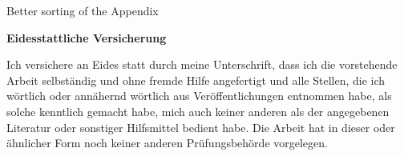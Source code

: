 \documentclass[12pt,a4paper]{article}
\begin{document}
Better sorting of the Appendix

\restoregeometry

\cleardoublepage
\newpage
\renewcommand*{\mkbibnamefamily}[1]{\textbf{#1}}
\renewcommand*{\mkbibnamegiven}[1]{\textbf{#1}}
\renewcommand*{\mkbibnameprefix}[1]{\textbf{#1}}
\renewcommand*{\mkbibnamesuffix}[1]{\textbf{#1}}




\newpage
\textbf{Eidesstattliche Versicherung}

\bigskip

Ich versichere an Eides statt durch meine Unterschrift, dass ich die vorstehende Arbeit selbständig und ohne fremde Hilfe angefertigt und alle Stellen, die ich wörtlich oder annähernd wörtlich aus Veröffentlichungen entnommen habe, als solche kenntlich gemacht habe, mich auch keiner anderen als der angegebenen Literatur oder sonstiger Hilfsmittel bedient habe. Die Arbeit hat in dieser oder ähnlicher Form noch keiner anderen Prüfungsbehörde vorgelegen.

\vspace{1cm}
\rule{0pt}{2\baselineskip} %
\par\noindent{} \hfill\makebox[2.25in]{\hrulefill}%
\par\noindent\makebox[2.25in][l]{} \hfill{}%
\end{document}
